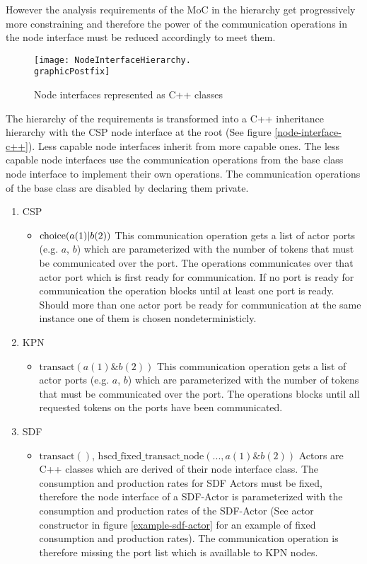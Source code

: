 However the analysis requirements of the MoC in the hierarchy
get progressively more constraining and therefore the power
of the communication operations in the node interface must
be reduced accordingly to meet them.

\begin{figure}
\centering
\texttt{[image: NodeInterfaceHierarchy.\\graphicPostfix]}\\
\caption{\label{node-interface-hierarchy}Node interfaces represented as C++ classes}
\end{figure}

The hierarchy of the requirements is transformed into a C++ inheritance
hierarchy with the CSP node interface at the root (See figure \ref{node-interface-c++}).
Less capable node interfaces inherit from more capable ones. The
less capable node interfaces use the communication operations from the base class node
interface to implement their own operations. The communication operations of the
base class are disabled by declaring them private.

\begin{enumerate}
\item CSP
  \begin{itemize}
  \item  $\mathrm{choice}( a(1) \arrowvert b(2) )$
    This communication operation gets a list of actor ports (e.g. $a$, $b$) which
    are parameterized with the number of tokens that must be communicated
    over the port. The operations communicates over that actor port which is first ready
    for communication. If no port is ready for communication the operation blocks until
    at least one port is ready. Should more than one actor port be ready for
    communication at the same instance one of them is chosen nondeterministicly.
  \end  {itemize}
\item KPN
  \begin{itemize}
  \item $\mathrm{transact}( a(1) \& b(2) )$
    This communication operation gets a list of actor ports (e.g. $a$, $b$) which
    are parameterized with the number of tokens that must be communicated
    over the port. The operations blocks until all requested tokens on the ports
    have been communicated.
  \end  {itemize}
\item SDF
  \begin{itemize}
  \item $\mathrm{transact}()$, $\mathrm{hscd\_fixed\_transact\_node}( ..., a(1) \& b(2) )$
    Actors are C++ classes which are derived of their node interface class.
    The consumption and production rates for SDF Actors must be fixed, therefore
    the node interface of a SDF-Actor is parameterized with the consumption and production
    rates of the SDF-Actor (See actor constructor in figure \ref{example-sdf-actor} for an
    example of fixed consumption and production rates). The communication operation  is
    therefore missing the port list which is availlable to KPN nodes.
  \end  {itemize}
\end{enumerate}

